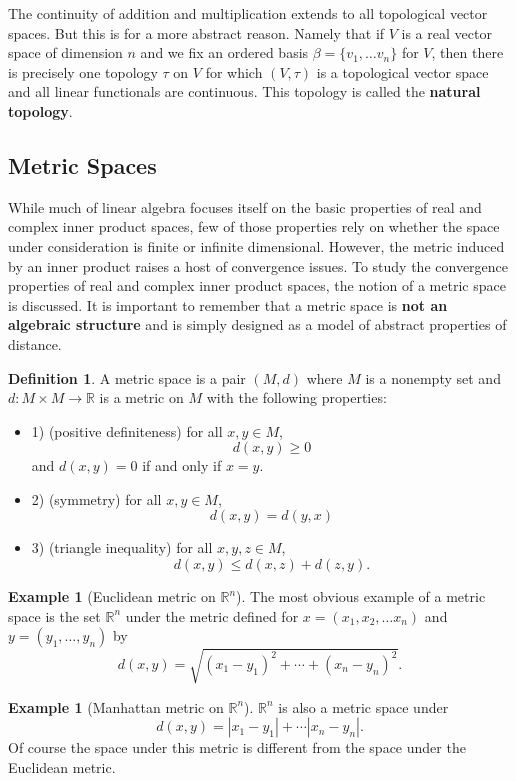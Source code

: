 \documentclass[psamsfonts]{amsart}
\theoremstyle{definition}
\newtheorem{exmp}[thm]{Example}
\newtheorem{defn}[thm]{Definition}
\theoremstyle{remark}
\numberwithin{equation}{section}
\begin{document}
The continuity of addition and multiplication extends to all topological vector spaces. But this is for a more abstract reason. Namely that if $V$ is a real vector space of dimension $n$ and we fix an ordered basis $\beta = \{ v_1, \dots v_n \}$ for $V$, then there is precisely one topology $\tau$ on $V$ for which $(V, \tau)$ is a topological vector space and all linear functionals are continuous. This topology is called the \textbf{natural topology}. 

\subsection{Metric Spaces}
While much of linear algebra focuses itself on the basic properties of real and complex inner product spaces, few of those properties rely on whether the space under consideration is finite or infinite dimensional. However, the metric induced by an inner product raises a host of convergence issues. To study the convergence properties of real and complex inner product spaces, the notion of a metric space is discussed. It is important to remember that a metric space is \textbf{not an algebraic structure} and is simply designed as a model of abstract properties of distance. 

\begin{defn}
A metric space is a pair $(M, d)$ where $M$ is a nonempty set and $d : M \times M \rightarrow \mathbb{R}$ is a metric on $M$ with the following properties: 
\begin{itemize}
    \item 1) (positive definiteness) for all $x,y \in M$, 
    $$d(x,y) \geq 0 $$
    and $d(x,y) = 0$ if and only if $x = y$. 
    \item 2) (symmetry) for all $x, y \in M$, 
    $$d(x,y) = d(y,x)$$
    \item 3) (triangle inequality) for all $x,y,z \in M$, 
     $$d (x,y) \leq d(x,z) + d(z,y).$$
\end{itemize}
\end{defn}

\begin{exmp} [Euclidean metric on $\mathbb{R}^n$]
The most obvious example of a metric space is the set $\mathbb{R}^n$ under the metric defined for $x = (x_1, x_2, \dots x_n)$ and $y = (y_1, \dots , y_n)$ by 
$$d(x,y) = \sqrt{(x_1-y_1)^2 + \cdots + (x_n - y_n)^2}.$$
\end{exmp}

\begin{exmp}[Manhattan metric on $\mathbb{R}^n$]
$\mathbb{R}^n$ is also a metric space under 
$$d(x,y) = |x_1 - y_1 | + \cdots |x_n - y_n |.$$
Of course the space under this metric is different from the space under the Euclidean metric. 
\end{exmp}
\end{document}
